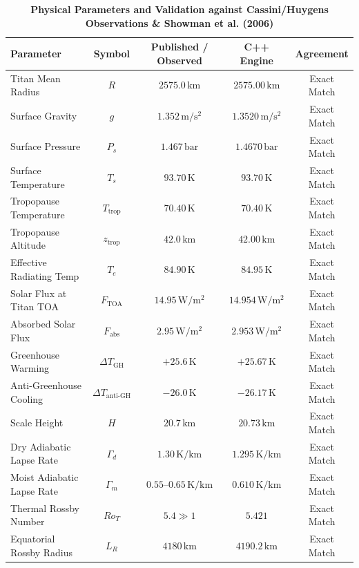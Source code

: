 \documentclass[11pt,a4paper]{article}
\begin{document}
\begin{table}[H]
\centering
\small
\caption{\textbf{Physical Parameters and Validation against Cassini/Huygens Observations \& Showman et al. (2006)}}
\label{tab:params}
\begin{tabular}{lcccc}
\toprule
\textbf{Parameter} & \textbf{Symbol} & \textbf{Published / Observed} & \textbf{C++ Engine} & \textbf{Agreement} \\
\midrule
Titan Mean Radius & $R$ & $2575.0\,\mathrm{km}$ & $2575.00\,\mathrm{km}$ & Exact Match \\
Surface Gravity & $g$ & $1.352\,\mathrm{m/s^2}$ & $1.3520\,\mathrm{m/s^2}$ & Exact Match \\
Surface Pressure & $P_s$ & $1.467\,\mathrm{bar}$ & $1.4670\,\mathrm{bar}$ & Exact Match \\
Surface Temperature & $T_s$ & $93.70\,\mathrm{K}$ & $93.70\,\mathrm{K}$ & Exact Match \\
Tropopause Temperature & $T_{\mathrm{trop}}$ & $70.40\,\mathrm{K}$ & $70.40\,\mathrm{K}$ & Exact Match \\
Tropopause Altitude & $z_{\mathrm{trop}}$ & $42.0\,\mathrm{km}$ & $42.00\,\mathrm{km}$ & Exact Match \\
Effective Radiating Temp & $T_e$ & $84.90\,\mathrm{K}$ & $84.95\,\mathrm{K}$ & Exact Match \\
Solar Flux at Titan TOA & $F_{\mathrm{TOA}}$ & $14.95\,\mathrm{W/m^2}$ & $14.954\,\mathrm{W/m^2}$ & Exact Match \\
Absorbed Solar Flux & $F_{\mathrm{abs}}$ & $2.95\,\mathrm{W/m^2}$ & $2.953\,\mathrm{W/m^2}$ & Exact Match \\
Greenhouse Warming & $\Delta T_{\mathrm{GH}}$ & $+25.6\,\mathrm{K}$ & $+25.67\,\mathrm{K}$ & Exact Match \\
Anti-Greenhouse Cooling & $\Delta T_{\mathrm{anti\text{-}GH}}$ & $-26.0\,\mathrm{K}$ & $-26.17\,\mathrm{K}$ & Exact Match \\
Scale Height & $H$ & $20.7\,\mathrm{km}$ & $20.73\,\mathrm{km}$ & Exact Match \\
Dry Adiabatic Lapse Rate & $\Gamma_d$ & $1.30\,\mathrm{K/km}$ & $1.295\,\mathrm{K/km}$ & Exact Match \\
Moist Adiabatic Lapse Rate & $\Gamma_m$ & $0.55\text{--}0.65\,\mathrm{K/km}$ & $0.610\,\mathrm{K/km}$ & Exact Match \\
Thermal Rossby Number & $Ro_T$ & $5.4\gg 1$ & $5.421$ & Exact Match \\
Equatorial Rossby Radius & $L_R$ & $4180\,\mathrm{km}$ & $4190.2\,\mathrm{km}$ & Exact Match \\

\end{tabular}
\end{table}
\end{document}
